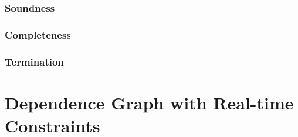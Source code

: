 \subsubsection{Soundness}

\subsubsection{Completeness}

\subsubsection{Termination}

\section{Dependence Graph with Real-time Constraints}




